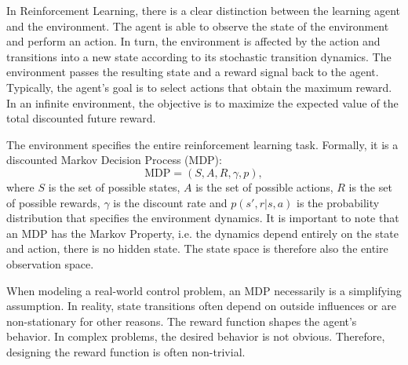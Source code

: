 In Reinforcement Learning, there is a clear distinction between the learning agent and the environment.
The agent is able to observe the state of the environment and perform an action.
In turn, the environment is affected by the action and transitions into a new state according to its stochastic transition dynamics.
The environment passes the resulting state and a reward signal back to the agent.
Typically, the agent's goal is to select actions that obtain the maximum reward.
In an infinite environment, the objective is to maximize the expected value of the total discounted future reward.

The environment specifies the entire reinforcement learning task.
Formally, it is a discounted Markov Decision Process (MDP):
$$ \text{MDP} = (S, A, R, \gamma, p),$$
where $S$ is the set of possible states, $A$ is the set of possible actions, $R$ is the set of possible rewards, $\gamma$ is the discount rate and $p(s', r|s,a)$ is the probability distribution that specifies the environment dynamics.
It is important to note that an MDP has the Markov Property, i.e. the dynamics depend entirely on the state and action, there is no hidden state.
The state space is therefore also the entire observation space.

When modeling a real-world control problem, an MDP necessarily is a simplifying assumption.
In reality, state transitions often depend on outside influences or are non-stationary for other reasons.
The reward function shapes the agent's behavior.
In complex problems, the desired behavior is not obvious.
Therefore, designing the reward function is often non-trivial.




